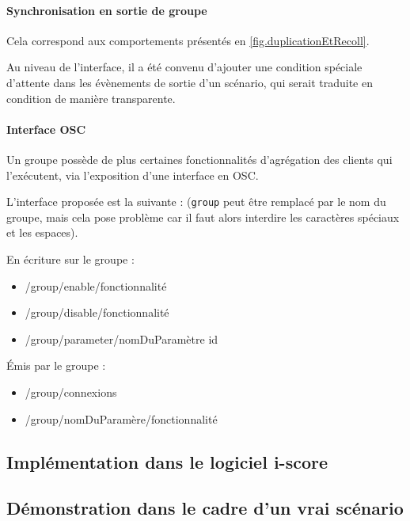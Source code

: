 \paragraph{Synchronisation en sortie de groupe}
Cela correspond aux comportements présentés en \cref{fig.duplicationEtRecoll}.

Au niveau de l'interface, il a été convenu d'ajouter une condition spéciale d'attente dans les évènements de sortie d'un scénario, qui serait traduite en condition  de manière transparente.

\paragraph{Interface OSC}
Un groupe possède de plus certaines fonctionnalités d'agrégation des clients qui l'exécutent, via l'exposition d'une interface en \ac{OSC}.

L'interface proposée est la suivante : (\texttt{group} peut être remplacé par le nom du groupe, mais cela pose problème car il faut alors interdire les caractères spéciaux et les espaces).

En écriture sur le groupe : 
\begin{itemize}
	\item /group/enable/fonctionnalité
	\item /group/disable/fonctionnalité
	\item /group/parameter/nomDuParamètre id
\end{itemize}

Émis par le groupe :
\begin{itemize}
	\item /group/connexions
	\item /group/nomDuParamère/fonctionnalité
\end{itemize}

\subsection{Implémentation dans le logiciel i-score}
\subsection{Démonstration dans le cadre d'un vrai scénario}
